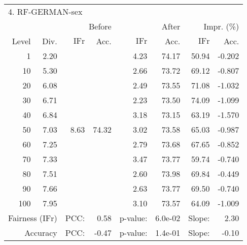 \begin{tabular}{rr||rr|rr|rr}
\multicolumn{4}{l}{4. RF-GERMAN-sex} & \multicolumn{2}{c}{} & \multicolumn{2}{c}{}\\
 &  & \multicolumn{2}{r|}{Before} & \multicolumn{2}{r|}{After} & \multicolumn{2}{r}{Impr. (\%)}\\
Level & Div. & $\mathrm{IFr}$ & Acc. & $\mathrm{IFr}$ & Acc. & $\mathrm{IFr}$ & Acc.\\
\hline
1 & 2.20 & \multirow{11}{*}{8.63} & \multirow{11}{*}{74.32} & 4.23 & 74.17 & 50.94 & -0.202\\
10 & 5.30 &  &  & 2.66 & 73.72 & 69.12 & -0.807\\
20 & 6.08 &  &  & 2.49 & 73.55 & 71.08 & -1.032\\
30 & 6.71 &  &  & 2.23 & 73.50 & 74.09 & -1.099\\
40 & 6.84 &  &  & 3.18 & 73.15 & 63.19 & -1.570\\
50 & 7.03 &  &  & 3.02 & 73.58 & 65.03 & -0.987\\
60 & 7.25 &  &  & 2.79 & 73.68 & 67.65 & -0.852\\
70 & 7.33 &  &  & 3.47 & 73.77 & 59.74 & -0.740\\
80 & 7.51 &  &  & 2.60 & 73.98 & 69.84 & -0.449\\
90 & 7.66 &  &  & 2.63 & 73.77 & 69.50 & -0.740\\
100 & 7.95 &  &  & 3.10 & 73.57 & 64.09 & -1.009\\
\hline
\multicolumn{2}{r}{Fairness ($\mathrm{IFr}$)} & PCC: & \multicolumn{1}{r}{0.58} & p-value:  & \multicolumn{1}{r}{6.0e-02} & Slope:  & 2.30\\
\multicolumn{2}{r}{Accuracy} & PCC: & \multicolumn{1}{r}{-0.47} & p-value:  & \multicolumn{1}{r}{1.4e-01} & Slope:  & -0.10\\
\end{tabular}